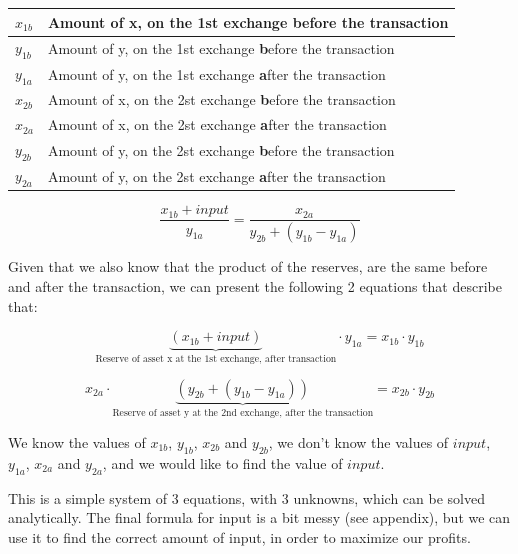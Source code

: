 \begin{table}[h]
\centering
\begin{tabular}{|l|l|}
\hline
$x_{1b}$ & Amount of x, on the 1st exchange \textbf{b}efore the transaction \\
\hline
$y_{1b}$ & Amount of y, on the 1st exchange \textbf{b}efore the transaction \\
\hline
$y_{1a}$ & Amount of y, on the 1st exchange \textbf{a}fter the transaction \\
\hline
$x_{2b}$ & Amount of x, on the 2st exchange \textbf{b}efore the transaction \\
\hline
$x_{2a}$ & Amount of x, on the 2st exchange \textbf{a}fter the transaction \\
\hline
$y_{2b}$ & Amount of y, on the 2st exchange \textbf{b}efore the transaction \\
\hline
$y_{2a}$ & Amount of y, on the 2st exchange \textbf{a}fter the transaction \\
\hline
\end{tabular}
\end{table}

\begin{equation}
\frac{x_{1b} + input}{y_{1a}} = \frac{x_{2a}}{y_{2b} + (y_{1b} - y_{1a})}
\end{equation}

Given that we also know that the product of the reserves, are the same before and
after the transaction, we can present the following 2 equations that describe
that:

\begin{equation}
\underbrace{(x_{1b} + input)}_{\text{Reserve of asset x at the 1st exchange, after transaction}} \cdot y_{1a} = x_{1b} \cdot y_{1b}
\end{equation}

\begin{equation}
x_{2a} \cdot \underbrace{(y_{2b} + (y_{1b} - y_{1a}))}_{\text{Reserve of asset y at
the 2nd exchange, after the transaction}} = x_{2b} \cdot y_{2b}
\end{equation}

We know the values of $x_{1b}$, $y_{1b}$, $x_{2b}$ and $y_{2b}$, we don't know
the values of $input$, $y_{1a}$, $x_{2a}$ and $y_{2a}$, and we would like to find the
value of $input$.

This is a simple system of 3 equations, with 3 unknowns, which can be solved
analytically. The final formula for input is a bit messy (see appendix), but we
can use it to find the correct amount of input, in order to maximize our
profits.

